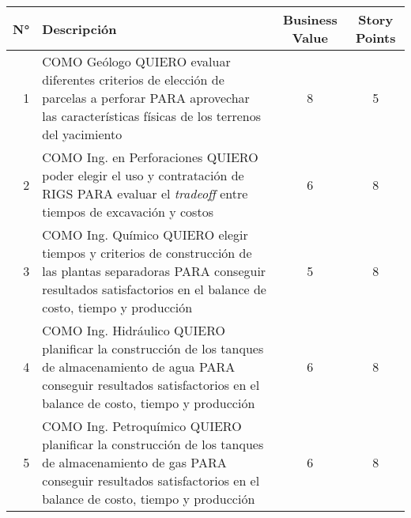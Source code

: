 \begin{center}
  \begin{tabular}{| r | p{10cm} | c | c | }
    \hline
    N° & Descripción & Business Value & Story Points\\  \hline
    
    1  & COMO Geólogo QUIERO evaluar diferentes criterios de elección de parcelas a perforar PARA aprovechar las características físicas de los terrenos del yacimiento & 8 & 5\\  \hline

    2  & COMO Ing. en Perforaciones QUIERO poder elegir el uso y contratación de RIGS PARA evaluar el \textit{tradeoff} entre tiempos de excavación y costos & 6 & 8\\ \hline
    
    3  & COMO Ing. Químico QUIERO elegir tiempos y criterios de construcción de las plantas separadoras PARA conseguir resultados satisfactorios en el balance de costo, tiempo y producción & 5 & 8\\ \hline
    
    4 & COMO Ing. Hidráulico QUIERO planificar la construcción de los tanques de almacenamiento de agua PARA conseguir resultados satisfactorios en el balance de costo, tiempo y producción & 6 & 8\\ \hline
    
    5 & COMO Ing. Petroquímico QUIERO planificar la construcción de los tanques de almacenamiento de gas 
    PARA conseguir resultados satisfactorios en el balance de costo, tiempo y producción & 6 & 8\\ \hline
    \end{tabular}
\end{center}

